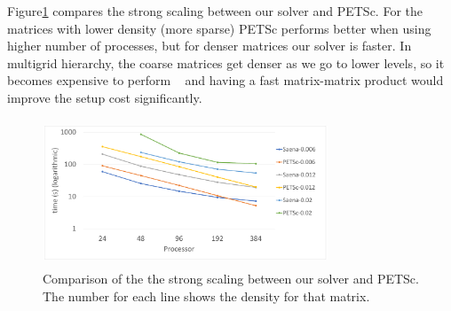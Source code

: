 Figure\ref{fig:petsc1} compares the strong scaling between our solver and PETSc. For the matrices with lower density (more sparse) PETSc performs better when using higher number of processes, but for denser matrices our solver is faster. In multigrid hierarchy, the coarse matrices get denser as we go to lower levels, so it becomes expensive to perform \mm~ and having a fast matrix-matrix product would improve the setup cost significantly.

\begin{figure}[tbh]
 \centering
 \includegraphics[width=8.5cm,height=4.4cm]{./figures/petsc1.pdf}
 \caption{Comparison of the the strong scaling between our solver and PETSc. The number for each line shows the density for that matrix.}
 \label{fig:petsc1}
\end{figure}

